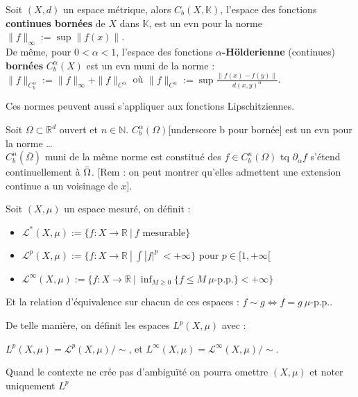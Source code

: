 \begin{ex}
    Soit $(X,d)$ un espace métrique, alors $C_b(X,\mathbb{K})$, l'espace des fonctions \textbf{continues bornées} de $X$ dans $\mathbb{K}$, est un evn pour la norme $\|f\|_\infty :=\sup\|f(x)\|$.\\
    De même, pour $ 0<\alpha <1$, l'espace des fonctions \textbf{$\alpha$-Hölderienne} (continues) \textbf{bornées} $C^\alpha_b(X)$ est un evn muni de la norme : \\
    $\|f\|_{C^\alpha_b }:=\|f\|_\infty +\|f\|_{C^\alpha }$ où $\|f\|_{C^\alpha }:=\sup \frac{\|f(x)-f(y)\|}{d(x,y)^\alpha }$.
\end{ex}
Ces normes peuvent aussi s'appliquer aux fonctions Lipschitziennes.

\begin{ex}
    Soit $\Omega\subset \mathbb{R} ^d$ ouvert et $n\in \mathbb{N} $. $C^\alpha _b(\Omega)$[underscore b pour bornée] est un evn pour la norme \ldots\\
    $C^n_b(\overline{\Omega})$ muni de la même norme est constitué des $f\in C^n_b(\Omega)$ tq $\partial_\alpha f$ s'étend continuellement à $\Bar{\Omega}$. [Rem : on peut montrer qu'elles admettent une extension continue a un voisinage de $x$].
\end{ex}

\begin{definition}[Espaces $L^p$]

Soit $(X,\mu)$ un espace mesuré, on définit : 

\begin{itemize}
    \item $\mathcal{L}^*(X,\mu):=\{f:X\to \mathbb{R} \ |\ f \text{ mesurable}\}$
    \item $\mathcal{L}^p(X,\mu) := \{ f : X \to \mathbb{R} ~|~ \int |f|^p \ < +\infty\}$ pour $p \in [1,+\infty[$
    \item $\mathcal{L}^\infty(X,\mu) := \{f : X \to \mathbb{R} ~|~ \inf_{M \geq 0}\{ f \leq M ~\mu\text{-p.p.}\} < +\infty \}$ 
\end{itemize}

Et la relation d'équivalence sur chacun de ces espaces : $f \sim g \Leftrightarrow f = g ~\mu\text{-p.p.}$.

De telle manière, on définit les espaces $L^p(X,\mu)$ avec : 

$L^p(X,\mu) = \mathcal{L}^p(X,\mu)/\sim$, et $L^\infty (X,\mu) = \mathcal{L}^{\infty}(X,\mu)/\sim $. 

Quand le contexte ne crée pas d'ambiguïté on pourra omettre $(X,\mu)$ et noter uniquement $L^p$ 
\end{definition}

